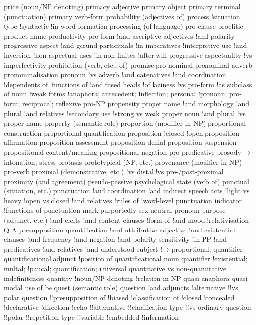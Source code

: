 price (noun/NP denoting)
primacy adjective
primary object
primary terminal (punctuation)
primary verb-form
probability (adjectives of)
process
!situation type
!syntactic
!in word-formation
processing (of language)
pro-clause
proclitic
product name
productivity
pro-form
!and ascriptive adjectives
!and polarity
progressive aspect
!and gerund-participials
!in imperatives
!interpretive use
!and inversion
!non-aspectual uses
!in non-finites
!after will
progressive aspectuality
!vs imperfectivity
prohibition (verb, etc., of)
promise
pro-nominal
pronominal adverb
pronominalisation
pronoun
!vs adverb
!and catenatives
!and coordination
!dependents of
!functions of
!and fused heads
!of laziness
!vs pro-form
!as subclass of noun
!weak forms
!anaphora; antecedent; inflection; personal
!pronoun; pro-form; reciprocal; reflexive
pro-NP
propensity
proper name
!and morphology
!and plural
!and relatives
!secondary use
!strong vs weak
proper noun
!and plural
!vs proper name
property (semantic role)
proportion (modifier in NP)
proportional construction
proportional quantification
proposition
!closed
!open
proposition affirmation
proposition assessment
proposition denial
proposition suspension
propositional content/meaning
propositional negation
pro-predicative
prosody → intonation, stress
protasis
prototypical (NP, etc.)
provenance (modifier in NP)
pro-verb
proximal (demonstrative, etc.)
!vs distal
!vs pre-/post-proximal
proximity (and agreement)
pseudo-passive
psychological state (verb of)
punctual (situation, etc.)
punctuation
!and coordination
!and indirect speech acts
!light vs heavy
!open vs closed
!and relatives
!rules of
!word-level
punctuation indicator
!functions of
punctuation mark
purportedly sex-neutral pronoun
purpose (adjunct, etc.)
!and clefts
!and content clauses
!form of
!and mood
!relativisation
Q-A presupposition
quantification
!and attributive adjective
!and existential clauses
!and frequency
!and negation
!and polarity-sensitivity
!in PP
!and predicatives
!and relatives
!and understood subject
!→ proportional; quantifier
quantificational adjunct
!position of
quantificational noun
quantifier
!existential; multal;
!paucal; quantification; universal
quantitative vs non-quantitative indefiniteness
quantity
!noun/NP denoting
!relation in NP
quasi-anaphora
quasi-modal use of be
quest (semantic role)
question
!and adjuncts
!alternative
!!vs polar question
!!presupposition of
!biased
!classification of
!closed
!concealed
!declarative
!direction
!echo
!!alternative
!!clarification type
!!vs ordinary question
!!polar
!!repetition type
!!variable
!embedded
!information
